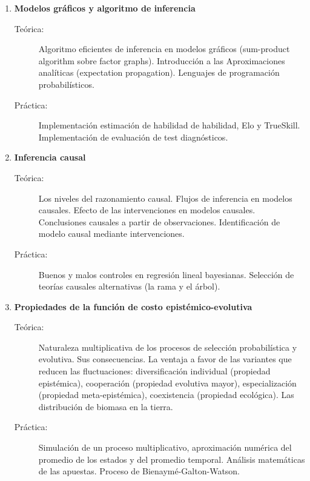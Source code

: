 \documentclass[10pt]{article}
\begin{document}
\begin{enumerate}
\vspace{0.1cm}
\item \textbf{Modelos gráficos y algoritmo de inferencia}
\vspace{-0.15cm}
\begin{description}
\item[Teórica:] Algoritmo eficientes de inferencia en modelos gráficos (sum-product algorithm sobre factor graphs). Introducción a las Aproximaciones analíticas (expectation propagation). Lenguajes de programación probabilísticos.
\item[Práctica:] Implementación estimación de habilidad de habilidad, Elo y TrueSkill. Implementación de evaluación de test diagnósticos.
\end{description}


\vspace{0.1cm}
\item \textbf{Inferencia causal}
\vspace{-0.15cm}
\begin{description}
\item[Teórica:] Los niveles del razonamiento causal. Flujos de inferencia en modelos causales. Efecto de las intervenciones en modelos causales. Conclusiones causales a partir de observaciones. Identificación de modelo causal mediante intervenciones.
\item[Práctica:] Buenos y malos controles en regresión lineal bayesianas. Selección de teorías causales alternativas (la rama y el árbol).
\end{description}







\vspace{0.1cm}
\item \textbf{Propiedades de la función de costo epistémico-evolutiva}
\vspace{-0.15cm}
\begin{description}
\item[Teórica:] Naturaleza multiplicativa de los procesos de selección probabilística y evolutiva. Sus consecuencias. La ventaja a favor de las variantes que reducen las fluctuaciones: diversificación individual (propiedad epistémica), cooperación (propiedad evolutiva mayor), especialización (propiedad meta-epistémica), coexistencia (propiedad ecológica). Las distribución de biomasa en la tierra.
\item[Práctica:] Simulación de un proceso multiplicativo, aproximación numérica del promedio de los estados y del promedio temporal. Análisis matemáticas de las apuestas. Proceso de Bienaymé-Galton-Watson.
\end{description}


\end{enumerate}
\end{document}
